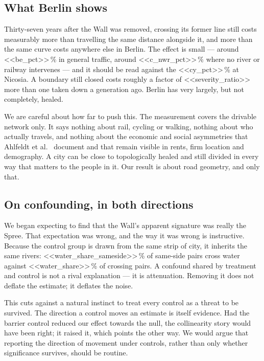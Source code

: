\documentclass[11pt,a4paper]{article}
\begin{document}
\subsection{What Berlin shows}

Thirty-seven years after the Wall was removed, crossing its former line still
costs measurably more than travelling the same distance alongside it, and more
than the same curve costs anywhere else in Berlin. The effect is small ---
around <<be_pct>>\,\% in general traffic, around <<c_nwr_pct>>\,\% where no
river or railway intervenes --- and it should be read against the
<<cy_pct>>\,\% at Nicosia. A boundary still closed costs roughly a factor of
<<severity_ratio>> more than one taken down a generation ago. Berlin has very
largely, but not completely, healed.

We are careful about how far to push this. The measurement covers the drivable
network only. It says nothing about rail, cycling or walking, nothing about who
actually travels, and nothing about the economic and social asymmetries that
Ahlfeldt et al.\ \cite{ahlfeldt2015} document and that remain visible in rents,
firm location and demography. A city can be close to topologically healed and
still divided in every way that matters to the people in it. Our result is about
road geometry, and only that.

\subsection{On confounding, in both directions}

We began expecting to find that the Wall's apparent signature was really the
Spree. That expectation was wrong, and the way it was wrong is instructive.
Because the control group is drawn from the same strip of city, it inherits the
same rivers: <<water_share_sameside>>\,\% of same-side pairs cross water against
<<water_share>>\,\% of crossing pairs. A confound shared by treatment and
control is not a rival explanation --- it is attenuation. Removing it does not
deflate the estimate; it deflates the noise.

This cuts against a natural instinct to treat every control as a threat to be
survived. The direction a control moves an estimate is itself evidence. Had the
barrier control reduced our effect towards the null, the collinearity story
would have been right; it raised it, which points the other way. We would argue
that reporting the direction of movement under controls, rather than only
whether significance survives, should be routine.
\end{document}
